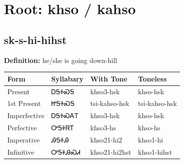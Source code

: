 \documentclass{article}%
\begin{document}
%
\normalsize%
\section*{Root: khso / kahso}%
\subsection*{sk-s-hi-hihst}%
\textbf{Definition: }%
he/she is going down{-}hill%
\\[0.5em]%
\begin{tabular}{|l|l|l|l|}%
\hline%
\textbf{Form}&\textbf{Syllabary}&\textbf{With Tone}&\textbf{Toneless}\\%
\hline%
Present&ᎠᎦᏐᏍᎦ&khso3{-}hsk&khso{-}hsk\\%
1st Present&ᏥᎦᏐᏍᎦ&tsi{-}kahso{-}hsk&tsi{-}kahso{-}hsk\\%
Imperfective&ᎠᎦᏐᏍᎪᎢ&khso3{-}hsk&khso{-}hsk\\%
Perfective&ᎤᎦᏐᏒᎢ&khso3{-}hs&khso{-}hs\\%
Imperative&ᎯᎦᏐᎯ&khso21{-}hi2&khso1{-}hi\\%
Infinitive&ᎤᎦᏐᎯᏍᏗ&khso21{-}hi2hst&khso1{-}hihst\\%
\hline%
\end{tabular}%
\\[1em]%
\end{document}
